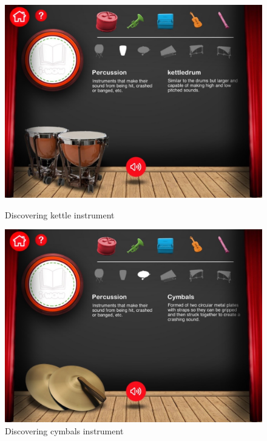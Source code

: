 \begin{figure}[ht!]
  \centering
  \includegraphics[width=350pt]{graphics/additional-screens/discovering_perc_kettle_screen.jpg}
  \vspace{0.05cm}
  \caption{Discovering kettle instrument}
  \vspace{0.6cm}

  \includegraphics[width=350pt]{graphics/additional-screens/discovering_perc_cymbals_screen.jpg}
  \vspace{0.05cm}
  \caption{Discovering cymbals instrument}
\end{figure}

